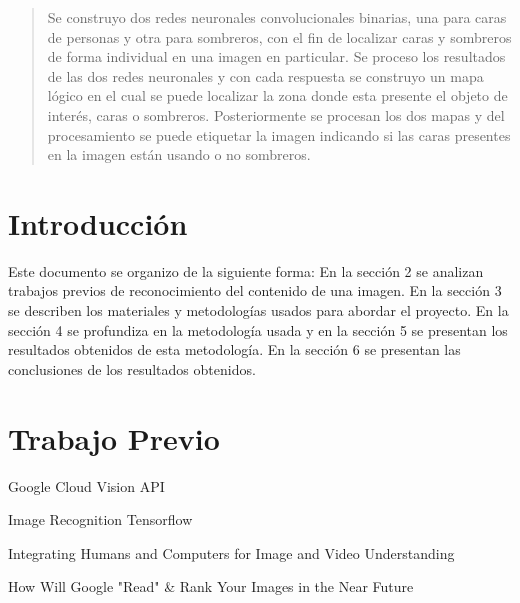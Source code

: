 \documentclass[10pt,twocolumn,letterpaper]{article}
\begin{document}

\begin{abstract}
Se construyo dos redes neuronales convolucionales binarias, una para caras de personas y otra para sombreros, con el fin de localizar caras y sombreros de forma individual en una imagen en particular. Se proceso los resultados de las dos redes neuronales y con cada respuesta se construyo un mapa lógico en el cual se puede localizar la zona donde esta presente el objeto de interés, caras o sombreros. Posteriormente se procesan los dos mapas y del procesamiento se puede etiquetar la imagen indicando si las caras presentes en la imagen están usando o no sombreros.
\end{abstract}

\section{Introducción}
Este documento se organizo de la siguiente forma: En la sección 2 se analizan trabajos previos de reconocimiento del contenido de una imagen. En la sección 3 se describen los materiales y metodologías usados para abordar el proyecto. En la sección 4 se profundiza en la metodología usada y en la sección 5 se presentan los resultados obtenidos de esta metodología. En la sección 6 se presentan las conclusiones de los resultados obtenidos.


\section{Trabajo Previo}

\begin{list_type}  
\item Google Cloud Vision API 
\item Image Recognition Tensorflow
\item Integrating Humans and Computers for Image and Video Understanding 
\item How Will Google "Read" \& Rank Your Images in the Near Future
\end{list_type}










\end{document}
